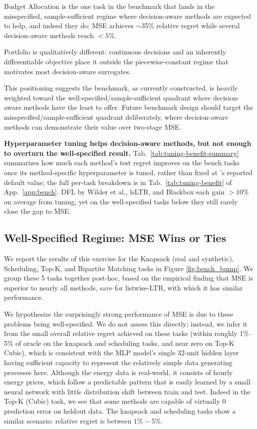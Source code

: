 Budget Allocation is the one task in the benchmark that lands in the misspecified, sample-sufficient regime where decision-aware methods are expected to help, and indeed they do: MSE achieves $\sim$35\% relative regret while several decision-aware methods reach $<5\%$.

Portfolio is qualitatively different: continuous decisions and an inherently differentiable objective place it outside the piecewise-constant regime that motivates most decision-aware surrogates.

This positioning suggests the benchmark, as currently constructed, is heavily weighted toward the well-specified/sample-sufficient quadrant where decision-aware methods have the least to offer. Future benchmark design should target the misspecified/sample-sufficient quadrant deliberately, where decision-aware methods can demonstrate their value over two-stage MSE.

\textbf{Hyperparameter tuning helps decision-aware methods, but not enough to overturn the well-specified result.} Tab.~\ref{tab:tuning-benefit-summary} summarizes how much each method's test regret improves on the bench tasks once its method-specific hyperparameter is tuned, rather than fixed at \citeauthor{gengBenchmarkingPtOPnO2024}'s reported default value; the full per-task breakdown is in Tab.~\ref{tab:tuning-benefit} of App.~\ref{app:bench}. DFL by Wilder et al., lsLTR, and Blackbox each gain $>10\%$ on average from tuning, yet on the well-specified tasks below they still rarely close the gap to MSE.


\subsection{Well-Specified Regime: MSE Wins or Ties}
We report the results of this exercise for the Knapsack (real and synthetic), Scheduling, Top-K, and Bipartite Matching tasks in Figure \ref{fig:bench_bump}. We group these 5 tasks together post-hoc, based on the empirical finding that MSE is superior to nearly all methods, save for listwise-LTR, with which it has similar performance.

We hypothesize the surprisingly strong performance of MSE is due to these problems being well-specified. We do not assess this directly; instead, we infer it from the small overall relative regret achieved on these tasks (within roughly 1\%--5\% of oracle on the knapsack and scheduling tasks, and near zero on Top-K Cubic), which is consistent with the MLP model's single 32-unit hidden layer having sufficient capacity to represent the relatively simple data generating processes here. Although the energy data is real-world, it consists of hourly energy prices, which follow a predictable pattern that is easily learned by a small neural network with little distribution shift between train and test. Indeed in the Top-K (Cubic) task, we see that some methods are capable of virtually 0 prediction error on heldout data. The knapsack and scheduling tasks show a similar scenario: relative regret is between $1\%-5\%$.

